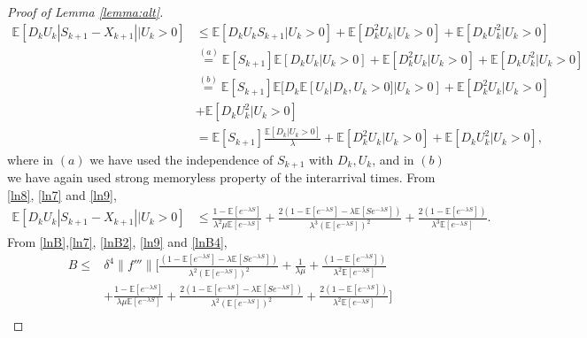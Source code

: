 \documentclass[11pt,letterpaper,reqno]{article}
\theoremstyle{thmstyleone}%
\theoremstyle{thmstyletwo}%
\theoremstyle{thmstylethree}%
\numberwithin{equation}{section}
\begin{document}
\begin{proof}[Proof of Lemma \ref{lemma:alt}]
\begin{align*}
    \mathbb E[D_kU_k|S_{k+1}-X_{k+1}||U_k>0] &\leq  \mathbb E[D_kU_kS_{k+1}|U_k>0] +\mathbb E[D_k^2U_k|U_k>0] +\mathbb E[D_kU_k^2|U_k>0] \\
    &\stackrel{(a)}{=}\mathbb E[S_{k+1}]\mathbb E[D_kU_k|U_k>0] +\mathbb E[D_k^2U_k|U_k>0] +\mathbb E[D_kU_k^2|U_k>0]\\
    &\stackrel{(b)}{=}\mathbb E[S_{k+1}]\mathbb E[D_k\mathbb E[U_k|D_k,U_k>0]|U_k>0]+\mathbb E[D_k^2U_k|U_k>0] \\
    &+\mathbb E[D_kU_k^2|U_k>0]\\
    &=\mathbb E[S_{k+1}]\frac{\mathbb E[D_k|U_k>0]}{\lambda}+\mathbb E[D_k^2U_k|U_k>0] +\mathbb E[D_kU_k^2|U_k>0],
\end{align*}
where in $(a)$ we have used the independence of $S_{k+1}$ with $D_k,U_k$, and in $(b)$ we have again used strong memoryless property of the interarrival times. From  \eqref{ln8}, \eqref{ln7} and \eqref{ln9},
\begin{align}\label{lnB4}
    \mathbb E[D_kU_k|S_{k+1}-X_{k+1}||U_k>0] &\leq \frac{1-\mathbb E[e^{-\lambda S}]}{\lambda^2\mu \mathbb E[e^{-\lambda S}]}+\frac{2\left(1 - \mathbb E[e^{-\lambda S}] - \lambda \mathbb E[S e^{-\lambda S}]\right)}{\lambda^3 (\mathbb E[e^{-\lambda S}])^2}+\frac{2(1-\mathbb E[e^{-\lambda S}])}{\lambda^3 \mathbb E[e^{-\lambda S}]}.
\end{align}
From \eqref{lnB},\eqref{ln7}, \eqref{lnB2}, \eqref{ln9} and \eqref{lnB4}, 
\begin{align}\label{lnBbound}
    B \leq& \delta^4 \|f'''\|\bigg[\frac{\left(1 - \mathbb E[e^{-\lambda S}] - \lambda \mathbb E[S e^{-\lambda S}]\right)}{\lambda^2 (\mathbb E[e^{-\lambda S}])^2}+\frac{1}{\lambda \mu} +\frac{(1-\mathbb E[e^{-\lambda S}])}{\lambda^2\mathbb E[e^{-\lambda S}]} \nonumber\\
    &+\frac{1-\mathbb E[e^{-\lambda S}]}{\lambda\mu \mathbb E[e^{-\lambda S}]}+\frac{2\left(1 - \mathbb E[e^{-\lambda S}] - \lambda \mathbb E[S e^{-\lambda S}]\right)}{\lambda^2 (\mathbb E[e^{-\lambda S}])^2}+\frac{2(1-\mathbb E[e^{-\lambda S}])}{\lambda^2 \mathbb E[e^{-\lambda S}]}\bigg] \nonumber\\

\end{align}
\end{proof}
\end{document}
